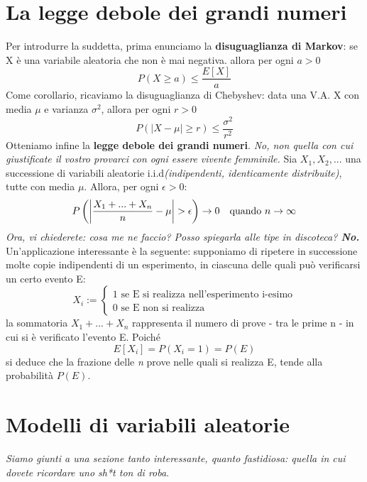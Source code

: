\documentclass[11pt]{article}
\begin{document}
\section{La legge debole dei grandi numeri}
Per introdurre la suddetta, prima enunciamo la \textbf{disuguaglianza di Markov}: se X è una variabile aleatoria che non è mai negativa. allora per ogni $a>0$
\begin{displaymath}
    P(X\ge a) \le \frac{E[X]}{a}
\end{displaymath}
Come corollario, ricaviamo la disuguaglianza di Chebyshev: data una V.A. X con media $\mu$ e varianza $\sigma^2$, allora per ogni $r>0$
\begin{displaymath}
    P(|X-\mu|\ge r) \le \frac{\sigma^2}{r^2}
\end{displaymath}
Otteniamo infine la \textbf{legge debole dei grandi numeri}. \textit{No, non quella con cui giustificate il vostro provarci con ogni essere vivente femminile.} Sia $X_1,X_2,...$ una successione di variabili aleatorie i.i.d\textit{(indipendenti, identicamente distribuite)}, tutte con media $\mu$. Allora, per ogni $\epsilon >0$:
\begin{displaymath}
    P\left(\left|\frac{X_1+...+X_n}{n} - \mu\right|>\epsilon \right)\rightarrow0\hspace{10px}\mbox{quando }n\rightarrow\infty
\end{displaymath}
\textit{Ora, vi chiederete: cosa me ne faccio? Posso spiegarla alle tipe in discoteca?\textbf{ No.}} Un'applicazione interessante è la seguente: supponiamo di ripetere in successione molte copie indipendenti di un esperimento, in ciascuna delle quali può verificarsi un certo evento E:
\begin{displaymath}
    X_i:=
    \begin{cases}
        1\mbox{ se E si realizza nell'esperimento i-esimo}\\ 
        0\mbox{ se E non si realizza}
    \end{cases}
\end{displaymath}
la sommatoria $X_1+...+X_n$ rappresenta il numero di prove - tra le prime n - in cui si è verificato l'evento E. Poiché 
\begin{displaymath}
    E[X_i]=P(X_i=1)=P(E)
\end{displaymath}
si deduce che la frazione delle \textit{n} prove nelle quali si realizza E, tende alla probabilità $P(E)$.
\section{Modelli di variabili aleatorie}
\textit{Siamo giunti a una sezione tanto interessante, quanto fastidiosa: quella in cui dovete ricordare uno sh*t ton di roba}.
\end{document}
